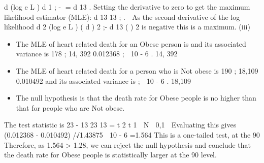 \documentclass[a4paper,12pt]{article}
\begin{document}
d (log e L )
d 
1
;\+\; - \;=\;
d 13
.
Setting the derivative to zero to get the maximum likelihood estimator (MLE):
d 13
\hat{\mu} 13 ;\+ .

As the second derivative of the log likelihood
d 2 (log e L )
( d  ) 2
;\+\;-
d 13
(  ) 2
is negative this is a maximum.
(iii)
\begin{itemize}
    \item The MLE of heart related death for an Obese person is
and its associated variance is
178
;\+
14, 392
0.012368
;\+  10 - 6 .
14, 392
\item The MLE of heart related death for a person who is Not obese is
190
;\+
18,109
0.010492
and its associated variance is
;\+  10 - 6 .
18,109
\item The null hypothesis is that the death rate for Obese people is no higher than
that for people who are Not obese.
\end{itemize}

The test statistic is
\hat{\mu} 23 - \hat{\mu} 13
23
13
\hat{\mu}
\hat{\mu}
\;=\;
t 2
t 1
 N  0,1 
Evaluating this gives (0.012368 - 0.010492) /√1.43875  10 - 6 =1.564
This is a one-tailed test, at the 90%
Therefore, as 1.564 > 1.28, we can reject the null hypothesis and conclude that
the death rate for Obese people is statistically larger at the 90%
level.
\newpage 
\end{document}
